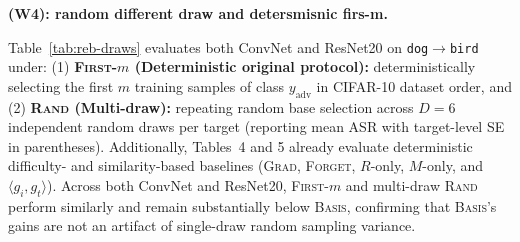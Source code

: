 \bigskip
\noindent\textbf{(W4): random different draw and detersmisnic firs-m.}

 Table~\ref{tab:reb-draws} evaluates both ConvNet and ResNet20 on \texttt{dog}$\rightarrow$\texttt{bird} under:
(1) \textbf{\textsc{First}-$m$ (Deterministic original protocol):} deterministically selecting the first $m$ training samples of class $y_{\text{adv}}$ in CIFAR-10 dataset order, and
(2) \textbf{\textsc{Rand} (Multi-draw):} repeating random base selection across $D=6$ independent random draws per target (reporting mean ASR with target-level SE in parentheses).
Additionally, Tables~4 and 5 already evaluate deterministic difficulty- and similarity-based baselines (\textsc{Grad}, \textsc{Forget}, $R$-only, $M$-only, and $\langle g_i, g_t\rangle$). Across both ConvNet and ResNet20, \textsc{First}-$m$ and multi-draw \textsc{Rand} perform similarly and remain substantially below \textsc{Basis}, confirming that \textsc{Basis}'s gains are not an artifact of single-draw random sampling variance.

